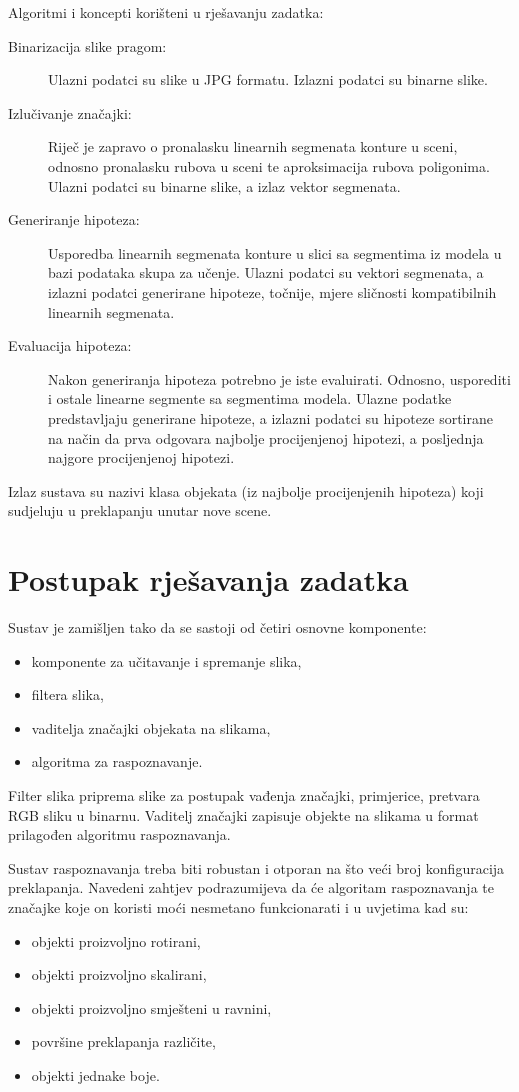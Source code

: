 \documentclass[10pt, a4paper]{article}
\begin{document}
Algoritmi i koncepti korišteni u rješavanju zadatka:
\begin{description}
\item[Binarizacija slike pragom:] Ulazni podatci su slike u JPG formatu. Izlazni podatci su binarne slike.
\item[Izlučivanje značajki:]  Riječ je zapravo o pronalasku linearnih segmenata konture u sceni, odnosno pronalasku rubova u sceni te aproksimacija rubova poligonima. Ulazni podatci su binarne slike, a izlaz vektor segmenata.
\item[Generiranje hipoteza:] Usporedba linearnih segmenata konture u slici sa segmentima iz modela u bazi podataka skupa za učenje. Ulazni podatci su vektori segmenata, a izlazni podatci generirane hipoteze, točnije, mjere sličnosti kompatibilnih linearnih segmenata.
\item[Evaluacija hipoteza:] Nakon generiranja hipoteza potrebno je iste evaluirati. Odnosno, usporediti i ostale linearne segmente sa segmentima modela. Ulazne podatke predstavljaju generirane hipoteze, a izlazni podatci su hipoteze sortirane na način da prva odgovara najbolje procijenjenoj hipotezi, a posljednja najgore procijenjenoj hipotezi.
\end{description}
Izlaz sustava su nazivi klasa objekata (iz najbolje procijenjenih hipoteza) koji sudjeluju u preklapanju unutar nove scene.

\section{Postupak rješavanja zadatka}

Sustav je zamišljen tako da se sastoji od četiri osnovne komponente:
\begin{itemize}
\item komponente za učitavanje i spremanje slika,
\item filtera slika,
\item vaditelja značajki objekata na slikama,
\item algoritma za raspoznavanje.
\end{itemize}
Filter slika priprema slike za postupak vađenja značajki, primjerice, pretvara RGB sliku u binarnu. Vaditelj značajki zapisuje objekte na slikama u format prilagođen algoritmu raspoznavanja.

Sustav raspoznavanja treba biti robustan i otporan na što veći broj konfiguracija preklapanja. Navedeni zahtjev podrazumijeva da će algoritam raspoznavanja te značajke koje on koristi moći nesmetano funkcionarati i u uvjetima kad su:
\begin{itemize}
\item objekti proizvoljno rotirani,
\item objekti proizvoljno skalirani,
\item objekti proizvoljno smješteni u ravnini,
\item površine preklapanja različite,
\item objekti jednake boje.
\end{itemize}
\end{document}
